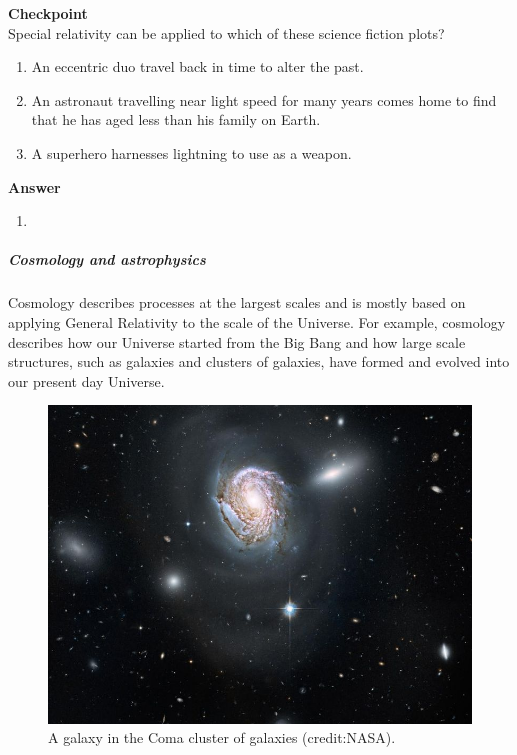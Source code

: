 \begin{framed}
\textbf{Checkpoint}\\
Special relativity can be applied to which of these science fiction plots?

\begin{enumerate}
\item An eccentric duo travel back in time to alter the past.
\item An astronaut travelling near light speed for many years comes home to find that he has aged less than his family on Earth.
\item A superhero harnesses lightning to use as a weapon.
\end{enumerate}

\begin{framed}
\textbf{Answer}\\
\begin{enumerate}[resume]
\item
\end{enumerate}
\end{framed}
\end{framed}

\subparagraph{Cosmology and astrophysics}

Cosmology describes processes at the largest scales and is mostly based on applying General Relativity to the scale of the Universe. For example, cosmology describes how our Universe started from the Big Bang and how large scale structures, such as galaxies and clusters of galaxies, have formed and evolved into our present day Universe.

\begin{figure}[!htbp]
\centering
\includegraphics[width=0.6\linewidth]{files/galaxies_in_Coma_clu-2efab0f27a437395c54cadf99cecdeb8.jpeg}
\caption[]{A galaxy in the Coma cluster of galaxies (credit:NASA).}
\label{fig:introduction:galaxiescomacluster}
\end{figure}

